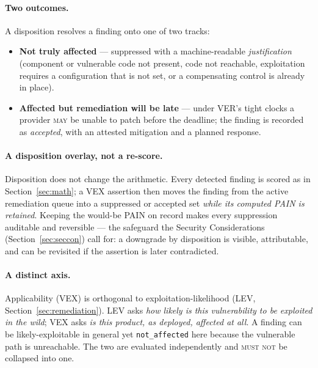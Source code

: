 \documentclass[11pt]{article}
\newcommand{\code}[1]{\texttt{#1}}
\newcommand{\rfckw}[1]{\textsc{#1}}
\begin{document}
\paragraph{Two outcomes.} A disposition resolves a finding onto one of two tracks:
\begin{itemize}[leftmargin=1.5em,nosep,topsep=3pt]
\item \textbf{Not truly affected} --- suppressed with a machine-readable
  \emph{justification} (component or vulnerable code not present, code not reachable,
  exploitation requires a configuration that is not set, or a compensating control is
  already in place).
\item \textbf{Affected but remediation will be late} --- under VER's tight clocks a
  provider \rfckw{may} be unable to patch before the deadline; the finding is recorded
  as \emph{accepted}, with an attested mitigation and a planned response.
\end{itemize}

\paragraph{A disposition overlay, not a re-score.} Disposition does not change the
arithmetic. Every detected finding is scored as in Section~\ref{sec:math}; a VEX
assertion then moves the finding from the active remediation queue into a suppressed or
accepted set \emph{while its computed PAIN is retained}. Keeping the would-be PAIN on
record makes every suppression auditable and reversible --- the safeguard the Security
Considerations (Section~\ref{sec:seccon}) call for: a downgrade by disposition is
visible, attributable, and can be revisited if the assertion is later contradicted.

\paragraph{A distinct axis.} Applicability (VEX) is orthogonal to
exploitation-likelihood (LEV, Section~\ref{sec:remediation}). LEV asks \emph{how likely
is this vulnerability to be exploited in the wild}; VEX asks \emph{is this product, as
deployed, affected at all}. A finding can be likely-exploitable in general yet
\code{not\_affected} here because the vulnerable path is unreachable. The two are
evaluated independently and \rfckw{must not} be collapsed into one.
\end{document}
